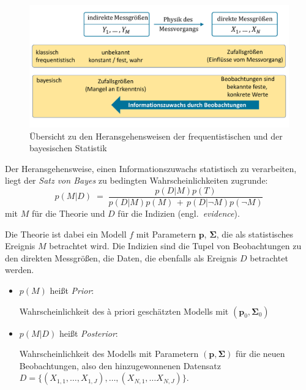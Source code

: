 \begin{figure}
\begin{center}
\includegraphics[width=140mm]{04_vorlesung/media/Konzept_Bayes.pdf}
\caption{Übersicht zu den Heransgehensweisen der frequentistischen und der bayesischen
Statistik}
\label{BayesFreqVergleich}
\end{center}
\end{figure}

Der Heransgehensweise, einen Informationszuwachs statistisch zu verarbeiten, liegt der \textsl{Satz von
Bayes} zu bedingten Wahrscheinlichkeiten zugrunde:
\begin{equation}
p(M | D) \; = \; \frac{p(D | M) p(T)}{p(D | M) p(M) \, + \, p(D | \lnot M) p(\lnot M)}
\label{bayestheorem}
\end{equation}
mit $M$ für die Theorie und $D$ für die Indizien (engl.\ \textsl{evidence}).


Die Theorie ist dabei
ein Modell $f$ mit Parametern $\mathbf{p}$, $\boldsymbol{\Sigma}$, die als statistisches Ereignis $M$
betrachtet wird. Die Indizien sind die Tupel von Beobachtungen zu
den direkten Messgrößen, die Daten, die ebenfalls als Ereignis $D$ betrachtet werden.
\begin{itemize}
\item $p(M)$ heißt \textsl{Prior}:

Wahrscheinlichkeit des {\`a} priori geschätzten
Modells mit $(\mathbf{p}_0, \boldsymbol{\Sigma}_0)$

\item $p(M | D)$ heißt \textsl{Posterior}:

Wahrscheinlichkeit des Modells mit Parametern $(\mathbf{p}, \boldsymbol{\Sigma})$
für die neuen Beobachtungen, also den hinzugewonnenen Datensatz
 $D = \{(X_{1,1},\dots,X_{1,J}), \dots,(X_{N,1},\dots  X_{N,J})\}$.
\end{itemize}


